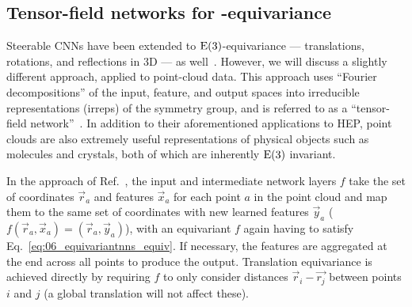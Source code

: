 \subsection{Tensor-field networks for \texorpdfstring{\EE[3]}{E(3)}-equivariance}
\label{sec:06_equivariantnns_e3}

Steerable CNNs have been extended to $\EE[3]$-equivariance --- translations, rotations, and reflections in 3D --- as well~\cite{weiler20183d}. 
However, we will discuss a slightly different approach, applied to point-cloud data.
This approach uses ``Fourier decompositions'' of the input, feature, and output spaces into irreducible representations (irreps) of the symmetry group, and is referred to as a ``tensor-field network''~\cite{thomas2018tensor}. 
In addition to their aforementioned applications to HEP, point clouds are also extremely useful representations of physical objects such as molecules and crystals, both of which are inherently $\EE[3]$ invariant.

In the approach of Ref.~\cite{thomas2018tensor}, the input and intermediate network layers $f$ take the set of coordinates $\vec{r}_a$ and features $\vec{x}_a$ for each point $a$ in the point cloud and map them to the same set of coordinates with new learned features $\vec{y}_a$ ($f(\vec{r}_a,\vec{x}_a) = (\vec{r}_a,\vec{y}_a)$), with an equivariant $f$ again having to satisfy Eq.~\ref{eq:06_equivariantnns_equiv}.
If necessary, the features are aggregated at the end across all points to produce the output.
Translation equivariance is achieved directly by requiring $f$ to only consider distances $\vec{r}_i - \vec{r_j}$ between points $i$ and $j$ (a global translation will not affect these). 

